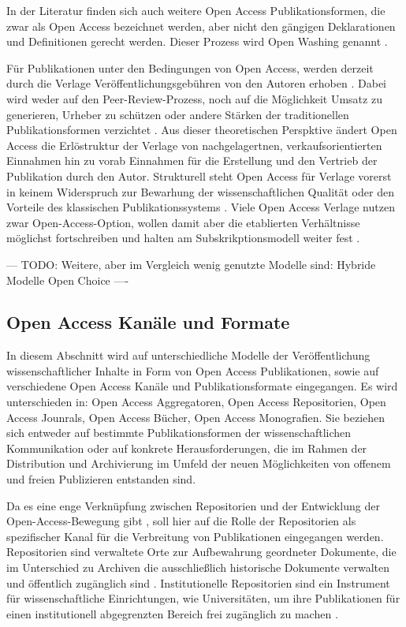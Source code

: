 In der Literatur \cite{suchen} finden sich auch weitere Open Access Publikationsformen, die zwar als Open Access bezeichnet werden, aber nicht den gängigen Deklarationen \cite{boai_2012} und Definitionen gerecht werden. Dieser Prozess wird Open Washing genannt \cite{suchen}. 

Für Publikationen unter den Bedingungen von Open Access, werden derzeit durch die Verlage Veröffentlichungsgebühren von den Autoren erhoben \cite{suchen}. Dabei wird weder auf den Peer-Review-Prozess, noch auf die Möglichkeit Umsatz zu generieren, Urheber zu schützen oder andere Stärken der traditionellen Publikationsformen verzichtet \cite{albert_2006_open_implications} \cite{Open_Access_net_2009}. Aus dieser theoretischen Perspktive ändert Open Access die Erlöstruktur der Verlage von nachgelagertnen, verkaufsorientierten Einnahmen hin zu vorab Einnahmen für die Erstellung und den Vertrieb der Publikation durch den Autor. Strukturell steht Open Access für Verlage vorerst in keinem Widerspruch zur Bewarhung der wissenschaftlichen Qualität oder den Vorteile des klassischen Publikationssystems \cite{Suber_2002}. Viele Open Access Verlage nutzen zwar Open-Access-Option, wollen damit aber die etablierten Verhältnisse möglichst fortschreiben und halten am Subskrikptionsmodell weiter fest \cite{schmidt_2007_goldenen}.

--- TODO: Weitere, aber im Vergleich wenig genutzte Modelle sind:
Hybride Modelle
Open Choice \cite{Hess_2006} 
----

\subsection{Open Access Kanäle und Formate}
In diesem Abschnitt wird auf unterschiedliche Modelle der Veröffentlichung wissenschaftlicher Inhalte in Form von Open Access Publikationen, sowie auf verschiedene Open Access Kanäle und Publikationsformate eingegangen. Es wird unterschieden in: Open Access Aggregatoren, Open Access Repositorien, Open Access Jounrals, Open Access Bücher, Open Access Monografien. Sie beziehen sich entweder auf bestimmte Publikationsformen der wissenschaftlichen Kommunikation oder auf konkrete Herausforderungen, die im Rahmen der Distribution und Archivierung im Umfeld der neuen Möglichkeiten von offenem und freien Publizieren entstanden sind. 

Da es eine enge Verknüpfung zwischen Repositorien und der Entwicklung der Open-Access-Bewegung gibt \cite{offhaus_2012_institutionelle_repos}, soll hier auf die Rolle der Repositorien als spezifischer Kanal für die Verbreitung von Publikationen eingegangen werden. Repositorien sind verwaltete Orte zur Aufbewahrung geordneter Dokumente, die im Unterschied zu Archiven die ausschließlich historische Dokumente verwalten und öffentlich zugänglich sind \cite{suchen}. Institutionelle Repositorien sind ein Instrument für wissenschaftliche Einrichtungen, wie Universitäten, um ihre Publikationen für einen institutionell abgegrenzten Bereich frei zugänglich zu machen \cite{dobratz_2007_open}.

